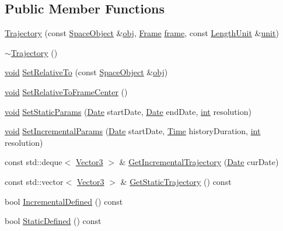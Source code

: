 \subsection*{Public Member Functions}
\begin{DoxyCompactItemize}
\item 
\hyperlink{class_trajectory_af06089eb6ef979e970ffea5c27d9d9c1}{Trajectory} (const \hyperlink{class_space_object}{Space\+Object} \&\hyperlink{glext_8h_a0c0d4701a6c89f4f7f0640715d27ab26}{obj}, \hyperlink{class_frame}{Frame} \hyperlink{class_trajectory_a37e42637b529f9939b499600a07d2660}{frame}, const \hyperlink{_quantity_8h_afb62d6d68e6cd2c62c96aa8c3aeb7d1f}{Length\+Unit} \&\hyperlink{class_trajectory_a8d881aa7724623b0a675a7f3cbe118bc}{unit})
\item 
\hyperlink{class_trajectory_ac673c37025ca5353ad99ab41c936e75d}{$\sim$\+Trajectory} ()
\item 
\hyperlink{wglext_8h_a9e6b7f1933461ef318bb000d6bd13b83}{void} \hyperlink{class_trajectory_a8b446ebdbb4e99e0688ba5eff107ad2e}{Set\+Relative\+To} (const \hyperlink{class_space_object}{Space\+Object} \&\hyperlink{glext_8h_a0c0d4701a6c89f4f7f0640715d27ab26}{obj})
\item 
\hyperlink{wglext_8h_a9e6b7f1933461ef318bb000d6bd13b83}{void} \hyperlink{class_trajectory_afbad58d4ab10afa7d50ec213380e4000}{Set\+Relative\+To\+Frame\+Center} ()
\item 
\hyperlink{wglext_8h_a9e6b7f1933461ef318bb000d6bd13b83}{void} \hyperlink{class_trajectory_a14dc0715fca73b67deaf3b86855b73d4}{Set\+Static\+Params} (\hyperlink{class_date}{Date} start\+Date, \hyperlink{class_date}{Date} end\+Date, \hyperlink{wglext_8h_a500a82aecba06f4550f6849b8099ca21}{int} resolution)
\item 
\hyperlink{wglext_8h_a9e6b7f1933461ef318bb000d6bd13b83}{void} \hyperlink{class_trajectory_a7fd57ddb9ca5afce1aaffb7e6fad66b0}{Set\+Incremental\+Params} (\hyperlink{class_date}{Date} start\+Date, \hyperlink{_quantity_8h_ab180382d5dc1bcb91259cbd59a5d86fc}{Time} history\+Duration, \hyperlink{wglext_8h_a500a82aecba06f4550f6849b8099ca21}{int} resolution)
\item 
const std\+::deque$<$ \hyperlink{class_vector3}{Vector3} $>$ \& \hyperlink{class_trajectory_a9386e11e76cd7769447559ca8b6013b1}{Get\+Incremental\+Trajectory} (\hyperlink{class_date}{Date} cur\+Date)
\item 
const std\+::vector$<$ \hyperlink{class_vector3}{Vector3} $>$ \& \hyperlink{class_trajectory_a6cb4148a8a21abce789f2a0097faf092}{Get\+Static\+Trajectory} () const 
\item 
bool \hyperlink{class_trajectory_a13373b83b45bb664c3b9b8ef8b108e75}{Incremental\+Defined} () const 
\item 
bool \hyperlink{class_trajectory_a44237f7a5422f3006b4b2aa64cadbb9c}{Static\+Defined} () const 
\end{DoxyCompactItemize}
